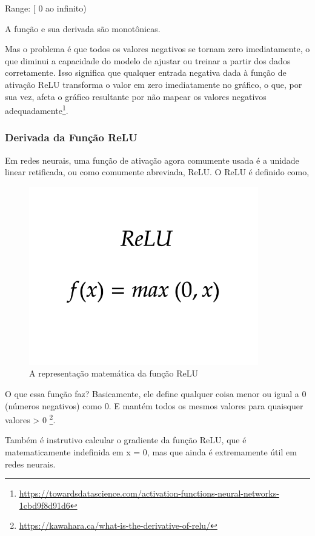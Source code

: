 Range: [ 0 ao infinito)

A função e sua derivada são monotônicas.

Mas o problema é que todos os valores negativos se tornam zero imediatamente, o que diminui a capacidade do modelo de ajustar ou treinar a partir dos dados corretamente. Isso significa que qualquer entrada negativa dada à função de ativação ReLU transforma o valor em zero imediatamente no gráfico, o que, por sua vez, afeta o gráfico resultante por não mapear os valores negativos adequadamente\footnote{\url{https://towardsdatascience.com/activation-functions-neural-networks-1cbd9f8d91d6}}.

\subsubsection[Derivada da Função ReLU]{Derivada da Função ReLU}

Em redes neurais, uma função de ativação agora comumente usada é a unidade linear retificada, ou como comumente abreviada, ReLU. O ReLU é definido como,

\begin{figure}[H]
   \begin{center}
      \includegraphics[width=10cm]{img/relu2.png}
      \caption{A representação matemática da função ReLU} \label{relu2}
   \end{center}
\end{figure}

O que essa função faz? Basicamente, ele define qualquer coisa menor ou igual a 0 (números negativos) como 0. E mantém todos os mesmos valores para quaisquer valores > 0 \footnote{\url{https://kawahara.ca/what-is-the-derivative-of-relu/}}.

Também é instrutivo calcular o gradiente da função ReLU, que é matematicamente indefinida em x = 0, mas que ainda é extremamente útil em redes neurais.

